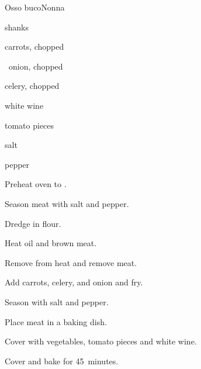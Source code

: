 \begin{recipe}{Osso buco}{Nonna}{}

\begin{ingredients}
\item {} shanks
\item carrots, chopped
\item \half~onion, chopped
\item celery, chopped
\item {} white wine
\item tomato pieces
\item salt
\item pepper
\end{ingredients}

\begin{directions}
\item Preheat oven to .
\item Season meat with salt and pepper.
\item Dredge in flour.
\item Heat oil and brown meat.
\item Remove from heat and remove meat.
\item Add carrots, celery, and onion and fry.
\item Season with salt and pepper.
\item Place meat in a baking dish.
\item Cover with vegetables, tomato pieces and white wine.
\item Cover and bake for 45~minutes.
\end{directions}

\end{recipe}
